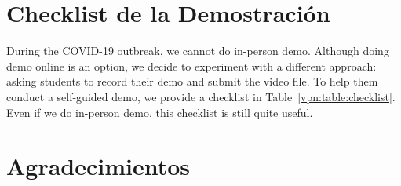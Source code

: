 \section{Checklist de la Demostración}


During the COVID-19 outbreak, we cannot do in-person demo. Although doing demo
online is an option, we decide to experiment with a different approach: asking students to 
record their demo and submit the video file. To help them conduct a self-guided demo,
we provide a checklist in Table~\ref{vpn:table:checklist}. Even if we do in-person demo, this checklist 
is still quite useful. 




\section*{Agradecimientos}







